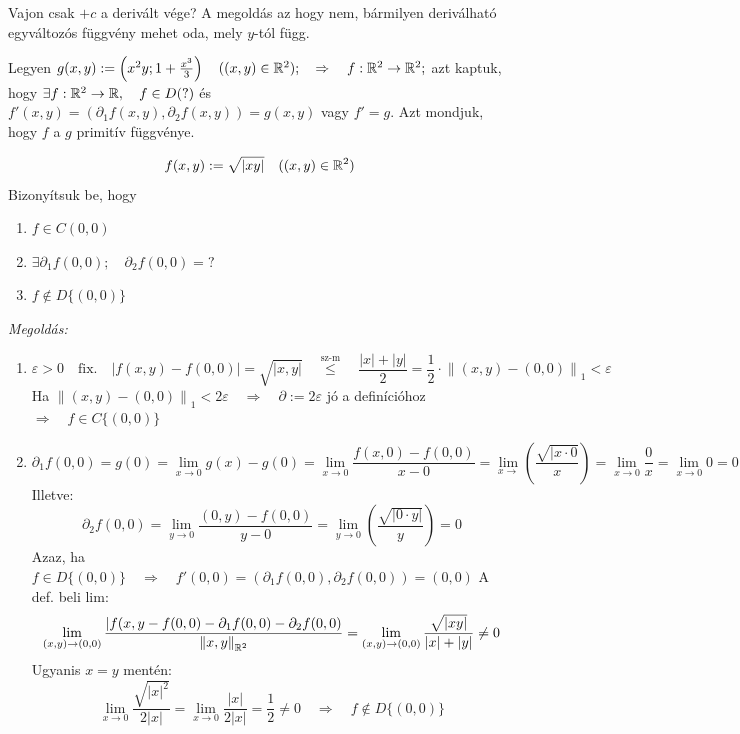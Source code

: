 \documentclass[a4paper,11.5pt]{article}
\newcommand{\norm}[1]{\left\lVert#1\right\rVert}
\begin{document}
	\begin{note}
		Vajon csak $+c$ a derivált vége? A megoldás az hogy nem, bármilyen deriválható egyváltozós függvény mehet oda, mely $y$-tól függ.
	\end{note}
	\begin{note}
		Legyen $g(x,y):=\left(x^2y;1+\frac{x^3}{3}\right)\quad ((x,y)\in\mathbb{R}^2);\quad \Rightarrow\quad f:\mathbb{R}^2\to\mathbb{R}^2;$ azt kaptuk, hogy $\exists f:\mathbb{R}^2\to\mathbb{R},\quad f\in D (?)$ és $f'(x,y)=(\partial_1f(x,y),\partial_2f(x,y))=g(x,y)$ vagy $f'=g$. Azt mondjuk, hogy $f$ a $g$ primitív függvénye.
	\end{note}
	\begin{task}
		\[ f(x,y):=\sqrt{|xy|}\quad ((x,y)\in\mathbb{R}^2) \]
		Bizonyítsuk be, hogy \begin{enumerate}
			\item $f\in C(0,0)$
			\item $\exists\partial_1f(0,0);\quad \partial_2f(0,0)=?$
			\item $f\notin D\{(0,0)\}$
		\end{enumerate}
		\textit{Megoldás:}
		\begin{enumerate}
			\item 
			\[ \varepsilon>0\quad \text{fix.}\quad |f(x,y)-f(0,0)|=\sqrt{|x,y|}\quad \overset{\text{sz-m}}{\leq}\quad \frac{|x|+|y|}{2}=\frac{1}{2}\cdot\norm{(x,y)-(0,0)}_1<\varepsilon \]
			Ha $\norm{(x,y)-(0,0)}_1<2\varepsilon\quad \Rightarrow\quad \partial:=2\varepsilon$ jó a definícióhoz\quad $\Rightarrow\quad f\in C\{(0,0)\}$
			\item \[\partial_1f(0,0)=g(0)=\lim_{x\to0}g(x)-g(0)=\lim_{x\to0}\frac{f(x,0)-f(0,0)}{x-0}=\lim_{x\to}\left(\frac{\sqrt{|x\cdot0}}{x}\right)=\lim_{x\to0}\frac{0}{x}=\lim_{x\to0}0=0 \]
			Illetve:
			\[ \partial_2f(0,0)=\lim_{y\to0}\frac{(0,y)-f(0,0)}{y-0}=\lim_{y\to0}\left(\frac{\sqrt{|0\cdot y|}}{y}\right)=0 \]
			Azaz, ha $f\in D\{(0,0)\}\quad \Rightarrow\quad f'(0,0)=(\partial_1f(0,0), \partial_2f(0,0))=(0,0)$
			A def. beli lim:
			\[ \lim_{(x,y)\to(0,0)}\frac{|f(x,y-f(0,0)-\partial_1f(0,0)-\partial_2f(0,0)}{\norm{x,y}_{\R^2}}=\lim_{(x,y)\to(0,0)}\frac{\sqrt{|xy|}}{|x|+|y|}\not=0 \]
			Ugyanis $x=y$ mentén:
			\[ \lim_{x\to0}\frac{\sqrt{|x|^2}}{2|x|}=\lim_{x\to0}\frac{|x|}{2|x|}=\frac{1}{2}\not=0\quad \Rightarrow\quad f\notin D\{(0,0)\} \]
		\end{enumerate}
	\end{task}
\end{document}
